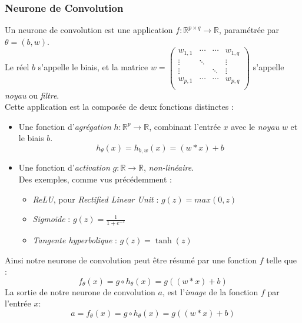 \documentclass[10pt,a4paper]{report}
\begin{document}
			\subsubsection{Neurone de Convolution}
			Un neurone de convolution est une application $f : \mathbb{R}^{p \times q} \rightarrow \mathbb{R}$, paramétrée par $\theta = (b,w)$.\\
			Le réel $b$ s'appelle le biais, et la matrice $w = \begin{pmatrix}
			w_{1,1} & \cdots & \cdots & w_{1,q} \\ 
			\vdots & \ddots &  & \vdots \\ 
			\vdots &  & \ddots & \vdots \\ 
			w_{p,1} & \cdots & \cdots & w_{p,q}\\
			\end{pmatrix}  $ s'appelle \emph{noyau} ou \emph{filtre}.\\
			Cette application est la composée de deux fonctions distinctes :
			\begin{itemize}
				\item Une fonction d’\emph{agrégation} $h : \mathbb{R}^p \rightarrow \mathbb{R}$, combinant l'entrée $x$ avec le \emph{noyau} $w$ et le biais $b$.\\
				$$h_\theta(x) = h_{b,w}(x) = (w * x) + b$$
				\item Une fonction d'\emph{activation} $g : \mathbb{R} \rightarrow \mathbb{R}$, \emph{non-linéaire}.\\
				Des exemples, comme vus précédemment :
				\begin{itemize}
					\item \emph{ReLU}, pour \emph{Rectified Linear Unit} : $g(z) = max(0,z)$
					\item \emph{Sigmoïde} : $g(z) = \frac{1}{1+e^{-z}}$
					\item \emph{Tangente hyperbolique} : $g(z) = \tanh(z)$
				\end{itemize}
			\end{itemize}
		Ainsi notre neurone de convolution peut être résumé par une fonction $f$ telle que :
		$$f_\theta(x) = g \circ h_\theta(x) = g((w * x) + b)$$
		La sortie de notre neurone de convolution $a$, est l'\emph{image} de la fonction $f$ par l'entrée $x$:
		$$a = f_\theta(x) = g \circ h_\theta(x) = g((w * x) + b)$$
\end{document}
